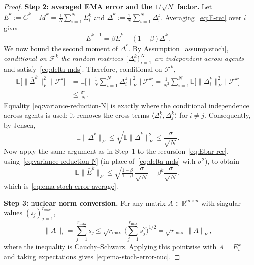 \documentclass{article}
\begin{document}
\begin{proof}
\medskip\noindent\textbf{Step 2: averaged EMA error and the $1/\sqrt{N}$ factor.}
Let $\bar E^k:=\bar C^k-\bar M^k=\tfrac{1}{N}\sum_{i=1}^N E_i^k$ and $\bar\Delta^k:=\tfrac{1}{N}\sum_{i=1}^N \Delta_i^k$.
Averaging~\eqref{eq:E-rec} over $i$ gives
\begin{equation}
\label{eq:Ebar-rec}
\bar E^{k+1}=\beta\bar E^k-(1-\beta)\bar\Delta^k.
\end{equation}
We now bound the second moment of $\bar\Delta^k$.
By Assumption~\ref{assump:stoch}, \emph{conditional on $\mathcal{F}^k$ the random matrices $\{\Delta_i^k\}_{i=1}^N$ are independent across agents} and satisfy~\eqref{eq:delta-mds}.
Therefore, conditional on $\mathcal{F}^k$,
\begin{align}
\mathbb{E}\bigl[\|\bar\Delta^k\|_F^2\mid\mathcal{F}^k\bigr]
&=\mathbb{E}\Big[\Big\|\frac{1}{N}\sum_{i=1}^N \Delta_i^k\Big\|_F^2\,\Big|\,\mathcal{F}^k\Big] 
=\frac{1}{N^2}\sum_{i=1}^N \mathbb{E}\bigl[\|\Delta_i^k\|_F^2\mid\mathcal{F}^k\bigr]
\label{eq:variance-reduction-N}\\
&\le \frac{\sigma^2}{N}.
\nonumber
\end{align}
Equality~\eqref{eq:variance-reduction-N} is exactly where the conditional independence across agents is used: it removes the cross terms $\langle\Delta_i^k,\Delta_j^k\rangle$ for $i\neq j$.
Consequently, by Jensen,
\begin{equation}
\label{eq:barDelta-first-moment}
\mathbb{E}\|\bar\Delta^k\|_F\le \sqrt{\mathbb{E}\|\bar\Delta^k\|_F^2}\le \frac{\sigma}{\sqrt{N}}.
\end{equation}
Now apply the same argument as in Step~1 to the recursion~\eqref{eq:Ebar-rec}, using~\eqref{eq:variance-reduction-N} (in place of~\eqref{eq:delta-mds} with $\sigma^2$), to obtain
\[
\mathbb{E}\|\bar E^k\|_F
\le \sqrt{\tfrac{1-\beta}{1+\beta}}\,\frac{\sigma}{\sqrt{N}}+\beta^k\frac{\sigma}{\sqrt{N}},
\]
which is~\eqref{eq:ema-stoch-error-average}.

\medskip\noindent\textbf{Step 3: nuclear norm conversion.}
For any matrix $A\in\mathbb{R}^{m\times n}$ with singular values $(s_j)_{j=1}^{r_{\max}}$,
\[
\|A\|_* = \sum_{j=1}^{r_{\max}} s_j \le \sqrt{r_{\max}}\,\Big(\sum_{j=1}^{r_{\max}} s_j^2\Big)^{1/2}=\sqrt{r_{\max}}\,\|A\|_F,
\]
where the inequality is Cauchy--Schwarz.
Applying this pointwise with $A=E_i^k$ and taking expectations gives~\eqref{eq:ema-stoch-error-nuc}.
\end{proof}
\end{document}
